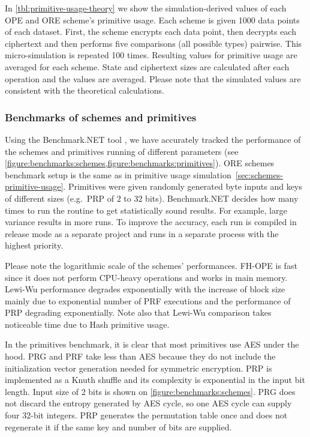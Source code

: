 			In \cref{tbl:primitive-usage-theory} we show the simulation-derived values of each OPE and ORE scheme's primitive usage.
			Each scheme is given 1000 data points of each dataset.
			First, the scheme encrypts each data point, then decrypts each ciphertext and then performs five comparisons (all possible types) pairwise.
			This micro-simulation is repeated 100 times.
			Resulting values for primitive usage are averaged for each scheme.
			State and ciphertext sizes are calculated after each operation and the values are averaged.
			Please note that the simulated values are consistent with the theoretical calculations.

		\subsubsection{Benchmarks of schemes and primitives}

			Using the Benchmark.NET tool \cite{benchmark-net}, we have accurately tracked the performance of the schemes and primitives running of different parameters (see \cref{figure:benchmarks:schemes,figure:benchmarks:primitives}).
			ORE schemes benchmark setup is the same as in primitive usage simulation~\ref{sec:schemes-primitive-usage}.
			Primitives were given randomly generated byte inputs and keys of different sizes (e.g.\ PRP of $2$ to $32$ bits).
			Benchmark.NET decides how many times to run the routine to get statistically sound results.
			For example, large variance results in more runs.
			To improve the accuracy, each run is compiled in release mode as a separate project and runs in a separate process with the highest priority.

			Please note the logarithmic scale of the schemes' performances.
			FH-OPE is fast since it does not perform CPU-heavy operations and works in main memory.
			Lewi-Wu performance degrades exponentially with the increase of block size mainly due to exponential number of PRF executions and the performance of PRP degrading exponentially.
			Note also that Lewi-Wu comparison takes noticeable time due to Hash primitive usage.

			In the primitives benchmark, it is clear that most primitives use AES under the hood.
			PRG and PRF take less than AES because they do not include the initialization vector generation needed for symmetric encryption.
			PRP is implemented as a Knuth shuffle \cite{knuth-shuffle} and its complexity is exponential in the input bit length.
			Input size of 2 bits is shown on \cref{figure:benchmarks:schemes}.
			PRG does not discard the entropy generated by AES cycle, so one AES cycle can supply four 32-bit integers.
			PRP generates the permutation table once and does not regenerate it if the same key and number of bits are supplied.

